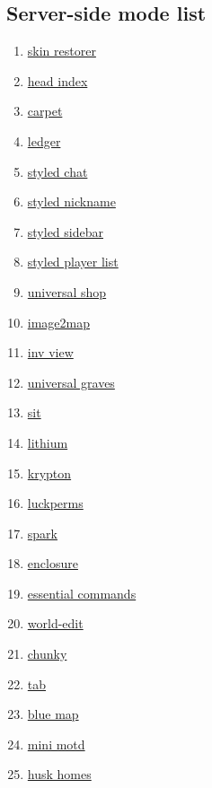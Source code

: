 \subsection{Server-side mode list}
\begin{enumerate}
    \item \href{https://modrinth.com/mod/skinrestorer}{skin restorer}
    \item \href{https://modrinth.com/mod/headindex}{head index}
    \item \href{https://modrinth.com/mod/carpet}{carpet}
    \item \href{https://modrinth.com/mod/ledger}{ledger}
    \item \href{https://modrinth.com/mod/styled-chat}{styled chat}
    \item \href{https://modrinth.com/mod/styled-nicknames}{styled nickname}
    \item \href{https://modrinth.com/mod/styled-sidebars}{styled sidebar}
    \item \href{https://modrinth.com/mod/styledplayerlist}{styled player list}
    \item \href{https://modrinth.com/mod/universal-shops}{universal shop}
    \item \href{https://modrinth.com/mod/image2map}{image2map}
    \item \href{https://modrinth.com/mod/invview}{inv view}
    \item \href{https://modrinth.com/mod/universal-graves}{universal graves}
    \item \href{https://modrinth.com/mod/bl4cks-sit}{sit}
    \item \href{https://modrinth.com/mod/lithium}{lithium}
    \item \href{https://modrinth.com/mod/krypton}{krypton}
    \item \href{https://modrinth.com/mod/luckperms}{luckperms}
    \item \href{https://modrinth.com/mod/spark}{spark}
    \item \href{https://modrinth.com/mod/enclosure}{enclosure}
    \item \href{https://modrinth.com/mod/essential-commands}{essential commands}
    \item \href{https://modrinth.com/plugin/worldedit}{world-edit}
    \item \href{https://modrinth.com/plugin/chunky}{chunky}
    \item \href{https://modrinth.com/plugin/tab-was-taken}{tab}
    \item \href{https://modrinth.com/plugin/bluemap}{blue map}
    \item \href{https://modrinth.com/plugin/minimotd}{mini motd}
    \item \href{https://modrinth.com/plugin/huskhomes}{husk homes}
\end{enumerate}


